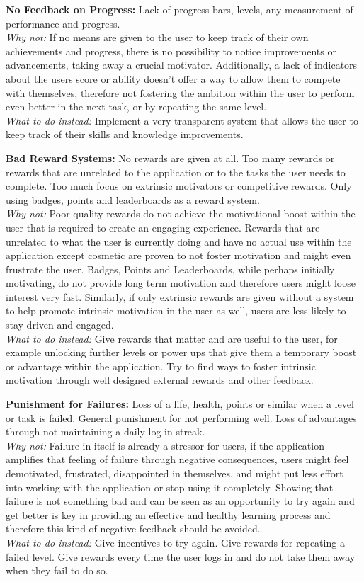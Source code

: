 \textbf{No Feedback on Progress:}
Lack of progress bars, levels, any measurement of performance and progress. \\ \indent
\textit{Why not:} If no means are given to the user to keep track of their own achievements and progress, there is no possibility to notice improvements or advancements, taking away a crucial motivator. Additionally, a lack of indicators about the users score or ability doesn't offer a way to allow them to compete with themselves, therefore not fostering the ambition within the user to perform even better in the next task, or by repeating the same level. \\ \indent
\textit{What to do instead:} Implement a very transparent system that allows the user to keep track of their skills and knowledge improvements.

\textbf{Bad Reward Systems:}
No rewards are given at all. Too many rewards or rewards that are unrelated to the application or to the tasks the user needs to complete. Too much focus on extrinsic motivators or competitive rewards. Only using badges, points and leaderboards as a reward system. \\ \indent
\textit{Why not:} Poor quality rewards do not achieve the motivational boost within the user that is required to create an engaging experience. Rewards that are unrelated to what the user is currently doing and have no actual use within the application except cosmetic are proven to not foster motivation and might even frustrate the user. Badges, Points and Leaderboards, while perhaps initially motivating, do not provide long term motivation and therefore users might loose interest very fast. Similarly, if only extrinsic rewards are given without a system to help promote intrinsic motivation in the user as well, users are less likely to stay driven and engaged. \\ \indent
\textit{What to do instead:} Give rewards that matter and are useful to the user, for example unlocking further levels or power ups that give them a temporary boost or advantage within the application. Try to find ways to foster intrinsic motivation through well designed external rewards and other feedback.

\textbf{Punishment for Failures:}
Loss of a life, health, points or similar when a level or task is failed. General punishment for not performing well. Loss of advantages through not maintaining a daily log-in streak. \\ \indent
\textit{Why not:} Failure in itself is already a stressor for users, if the application amplifies that feeling of failure through negative consequences, users might feel demotivated, frustrated, disappointed in themselves, and might put less effort into working with the application or stop using it completely. Showing that failure is not something bad and can be seen as an opportunity to try again and get better is key in providing an effective and healthy learning process and therefore this kind of negative feedback should be avoided. \\ \indent
\textit{What to do instead:} Give incentives to try again. Give rewards for repeating a failed level. Give rewards every time the user logs in and do not take them away when they fail to do so.

